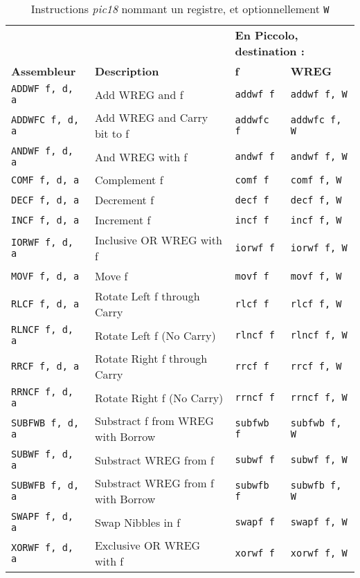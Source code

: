 \begin{table}[!ht]
  \centering
  \small
  \begin{tabular}{llll}
     &  & \multicolumn{2}{l}{\textbf{En Piccolo, destination :}} \\
    \textbf{Assembleur} & \textbf{Description} & \textbf{f} & \textbf{WREG}\\
    \hline
    \texttt{ADDWF f, d, a} & Add WREG and f & \texttt{addwf f}  & \texttt{addwf f, W} \\
    \texttt{ADDWFC f, d, a} & Add WREG and Carry bit to f & \texttt{addwfc f} & \texttt{addwfc f, W}\\
    \texttt{ANDWF f, d, a} & And WREG with f & \texttt{andwf f} & \texttt{andwf f, W}\\
    \texttt{COMF f, d, a} & Complement f & \texttt{comf f} & \texttt{comf f, W}\\
    \texttt{DECF f, d, a} & Decrement f & \texttt{decf f} & \texttt{decf f, W}\\
    \texttt{INCF f, d, a} & Increment f & \texttt{incf f}& \texttt{incf f, W}\\
    \texttt{IORWF f, d, a} & Inclusive OR WREG with f & \texttt{iorwf f} & \texttt{iorwf f, W}\\
    \texttt{MOVF f, d, a} & Move f & \texttt{movf f} & \texttt{movf f, W}\\
    \texttt{RLCF f, d, a} & Rotate Left f through Carry & \texttt{rlcf f} & \texttt{rlcf f, W}\\
    \texttt{RLNCF f, d, a} & Rotate Left f (No Carry) & \texttt{rlncf f} & \texttt{rlncf f, W}\\
    \texttt{RRCF f, d, a} & Rotate Right f through Carry & \texttt{rrcf f} & \texttt{rrcf f, W}\\
    \texttt{RRNCF f, d, a} & Rotate Right f (No Carry) & \texttt{rrncf f} & \texttt{rrncf f, W}\\
    \texttt{SUBFWB f, d, a} & Substract f from WREG with Borrow & \texttt{subfwb f} & \texttt{subfwb f, W}\\
    \texttt{SUBWF f, d, a} & Substract WREG from f & \texttt{subwf f} & \texttt{subwf f, W}\\
    \texttt{SUBWFB f, d, a} & Substract WREG from f with Borrow & \texttt{subwfb f} & \texttt{subwfb f, W}\\
    \texttt{SWAPF f, d, a} & Swap Nibbles in f & \texttt{swapf f} & \texttt{swapf f, W}\\
    \texttt{XORWF f, d, a} & Exclusive OR WREG with f & \texttt{xorwf f} & \texttt{xorwf f, W}\\
  \hline
  \end{tabular}
  \caption{Instructions \emph{pic18} nommant un registre, et optionnellement \texttt{W}}
\end{table}


